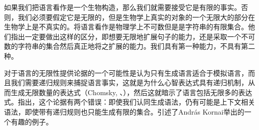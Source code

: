 如果我们把语言看作是一个生物构造，那么我们就需要接受它是有限的事实。否则，我们必须要假定它是无限的，但是生物学上真实的对象的一个无限大的部分在生物学上是不真实的\citep[]{Postal2009a}。\citet{LL2011a}将语言看作是物理学上不可数但是是字符串的有限集合。他们指出一定要做出这样的区分，即想要无限地扩展句子的能力，还是采取一个不可数的字符串的集合然后真正地将之扩展的能力。我们具有第一种能力，不具有第二种。

对于语言的无限性提供论据的一个可能性是认为只有生成语言适合于模拟语言，而且我们需要递归规则来捕捉语言事实，这就是为什么心智表达式具有递归机制，从而生成无限数量的表达式（Chomsky, \citeyear[]{Chomsky56a-u}、\citeyear[--87]{Chomsky2002a-u}），然后这就暗示了语言包括无限多的表达式。\citet{PS2010a}指出，这个论据有两个错误\citet{PS2010a}：即使我们认同生成语法，仍有可能是上下文相关语法，即使带有递归规则也只能生成有限的集合。\citet[120--121]{PS2010a}引述了Andr{\'a}s Kornai举出的一个有趣的例子。


